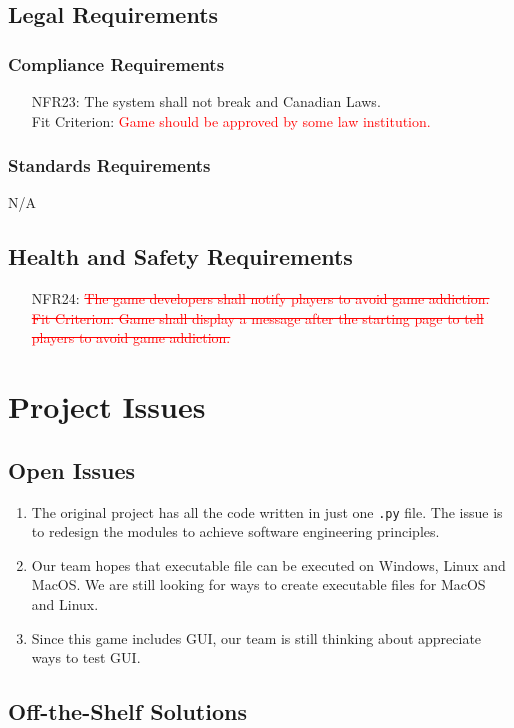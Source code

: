 \documentclass[12pt]{article}
\begin{document}
\subsection{Legal Requirements}
\subsubsection{Compliance Requirements}
\begin{itemize}
\item[NFR23:]The system shall not break and Canadian Laws. \\Fit Criterion: 
\textcolor{red}{Game should be approved by some law institution.}
\end{itemize}
\subsubsection{Standards Requirements}
N/A
\subsection{Health and Safety Requirements}
\begin{itemize}
\item[NFR24:] \textcolor{red}{\st{The game developers shall notify players to 
avoid game addiction.\\Fit Criterion: Game shall display a message after the starting
page to tell players to avoid game addiction.}}
\end{itemize}
\newpage
\section{Project Issues}
\subsection{Open Issues}
\begin{enumerate}[{Issue}1.]
\item The original project has all the code written in just 
one \verb|.py| file. The issue is to redesign the modules to
achieve software engineering principles.
\item Our team hopes that executable file can be executed on
Windows, Linux and MacOS. We are still looking for ways to 
create executable files for MacOS and Linux.
\item Since this game includes GUI, our team is still thinking
about appreciate ways to test GUI.
\end{enumerate}
\subsection{Off-the-Shelf Solutions}
\end{document}
